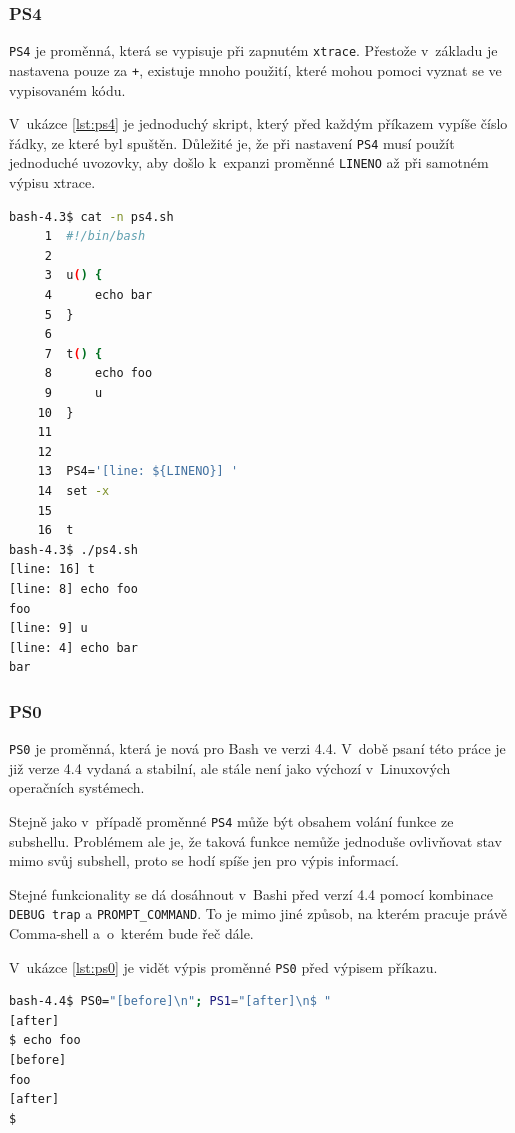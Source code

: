 \documentclass[thesis=M,czech]{FITthesis}[2012/06/26]
\begin{document}
%
%
%
\subsubsection{PS4}
\texttt{PS4} je proměnná, která se vypisuje při zapnutém \texttt{xtrace}. Přestože v~základu je nastavena pouze za \texttt{+}, existuje mnoho použití, které mohou pomoci vyznat se ve vypisovaném kódu.

V~ukázce \ref{lst:ps4} je jednoduchý skript, který před každým příkazem vypíše číslo řádky, ze které byl spuštěn. Důležité je, že při nastavení \texttt{PS4} musí použít jednoduché uvozovky, aby došlo k~expanzi proměnné \texttt{LINENO} až při samotném výpisu xtrace.

\noindent
\begin{minipage}{\linewidth}
\begin{lstlisting}[language=bash, caption={\texttt{PS4}}, label={lst:ps4}]
bash-4.3$ cat -n ps4.sh
     1	#!/bin/bash
     2
     3	u() {
     4		echo bar
     5	}
     6
     7	t() {
     8		echo foo
     9		u
    10	}
    11
    12
    13	PS4='[line: ${LINENO}] '
    14	set -x
    15
    16	t
bash-4.3$ ./ps4.sh
[line: 16] t
[line: 8] echo foo
foo
[line: 9] u
[line: 4] echo bar
bar
\end{lstlisting}
\end{minipage}

%
%
%
\subsubsection{PS0}

\texttt{PS0} je proměnná, která je nová pro Bash ve verzi 4.4. V~době psaní této práce je již verze 4.4 vydaná a stabilní, ale stále není jako výchozí v~Linuxových operačních systémech.

Stejně jako v~případě proměnné \texttt{PS4} může být obsahem volání funkce ze subshellu. Problémem ale je, že taková funkce nemůže jednoduše ovlivňovat stav mimo svůj subshell, proto se hodí spíše jen pro výpis informací.

Stejné funkcionality se dá dosáhnout v~Bashi před verzí 4.4 pomocí kombinace \texttt{DEBUG trap} a \texttt{PROMPT\_COMMAND}. To je mimo jiné způsob, na kterém pracuje právě Comma-shell a~o~kterém bude řeč dále.

V~ukázce \ref{lst:ps0} je vidět výpis proměnné \texttt{PS0} před výpisem příkazu.

\noindent
\begin{minipage}{\linewidth}
\begin{lstlisting}[language=bash, caption={\texttt{PS0}}, label={lst:ps0}]
bash-4.4$ PS0="[before]\n"; PS1="[after]\n$ "
[after]
$ echo foo
[before]
foo
[after]
$
\end{lstlisting}
\end{minipage}
\end{document}
